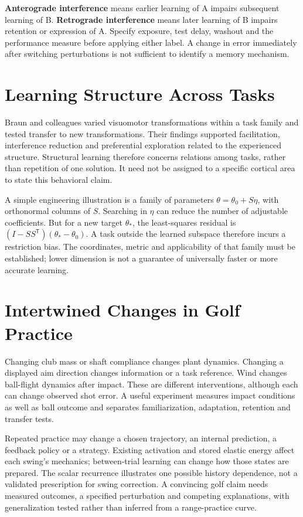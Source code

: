 \textbf{Anterograde interference} means earlier learning of A impairs subsequent
learning of B. \textbf{Retrograde interference} means later learning of B impairs
retention or expression of A. Specify exposure, test delay, washout and the
performance measure before applying either label. A change in error immediately
after switching perturbations is not sufficient to identify a memory mechanism.

\section{Learning Structure Across Tasks}

Braun and colleagues varied visuomotor transformations within a task family and
tested transfer to new transformations. Their findings supported facilitation,
interference reduction and preferential exploration related to the experienced
structure\cite{BraunStructure2009Review}. Structural learning therefore concerns
relations among tasks, rather than repetition of one solution. It need not be
assigned to a specific cortical area to state this behavioral claim.

A simple engineering illustration is a family of parameters
$\theta=\theta_0+S\eta$, with orthonormal columns of $S$. Searching in $\eta$
can reduce the number of adjustable coefficients. But for a new target
$\theta_*$, the least-squares residual is
$(I-SS^{\mathsf T})(\theta_*-\theta_0)$. A task outside the learned subspace
therefore incurs a restriction bias. The coordinates, metric and applicability
of that family must be established; lower dimension is not a guarantee of
universally faster or more accurate learning.

\section{Intertwined Changes in Golf Practice}

Changing club mass or shaft compliance changes plant dynamics. Changing a
displayed aim direction changes information or a task reference. Wind changes
ball-flight dynamics after impact. These are different interventions, although
each can change observed shot error. A useful experiment measures impact
conditions as well as ball outcome and separates familiarization, adaptation,
retention and transfer tests.

Repeated practice may change a chosen trajectory, an internal prediction, a
feedback policy or a strategy. Existing activation and stored elastic energy
affect each swing's mechanics; between-trial learning can change how those states
are prepared. The scalar recurrence illustrates one possible history dependence,
not a validated prescription for swing correction. A convincing golf claim needs
measured outcomes, a specified perturbation and competing explanations, with
generalization tested rather than inferred from a range-practice curve.

